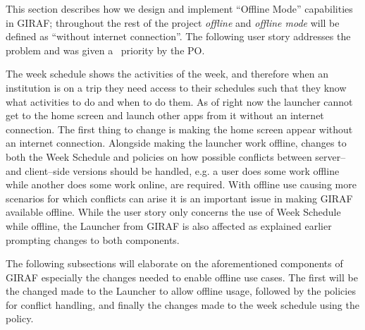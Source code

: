 This section describes how we design and implement \enquote{Offline Mode} capabilities in GIRAF; throughout the rest of the project \textit{offline} and \textit{offline mode} will be defined as \enquote{without internet connection}.
The following user story addresses the problem and was given a \phigh~priority by the PO.

\begin{center}
\end{center}
The week schedule shows the activities of the week, and therefore when an institution is on a trip they need access to their schedules such that they know what activities to do and when to do them.
As of right now the launcher cannot get to the home screen and launch other apps from it without an internet connection.
The first thing to change is making the home screen appear without an internet connection.
Alongside making the launcher work offline, changes to both the Week Schedule and policies on how possible conflicts between server-- and client--side versions should be handled, e.g. a user does some work offline while another does some work online, are required.
With offline use causing more scenarios for which conflicts can arise it is an important issue in making GIRAF available offline.
While the user story only concerns the use of Week Schedule while offline, the Launcher from GIRAF is also affected as explained earlier prompting changes to both components.

The following subsections will elaborate on the aforementioned components of GIRAF especially the changes needed to enable offline use cases.
The first will be the changed made to the Launcher to allow offline usage, followed by the policies for conflict handling, and finally the changes made to the week schedule using the policy.
